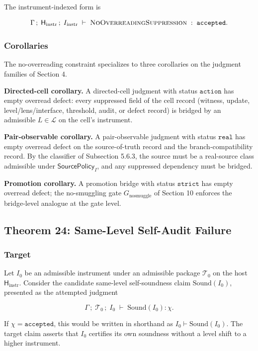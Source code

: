 \documentclass[11pt]{article}
\theoremstyle{definition}
\begin{document}
The instrument-indexed form is

\[
\Gamma\,;\;\mathsf H_{\mathrm{instr}}\,;\;I_{\mathrm{instr}}\;\vdash\;\textsc{NoOverreadingSuppression}\;:\;\texttt{accepted}.
\]

\subsubsection{Corollaries}

The no-overreading constraint specializes to three corollaries on the judgment families of Section 4.

\textbf{Directed-cell corollary.} A directed-cell judgment with status \(\texttt{action}\) has empty overread defect: every suppressed field of the cell record (witness, update, level/lens/interface, threshold, audit, or defect record) is bridged by an admissible \(L\in\mathcal L\) on the cell's instrument.

\textbf{Pair-observable corollary.} A pair-observable judgment with status \(\texttt{real}\) has empty overread defect on the source-of-truth record and the branch-compatibility record. By the classifier of Subsection 5.6.3, the source must be a real-source class admissible under \(\mathsf{SourcePolicy}_I\), and any suppressed dependency must be bridged.

\textbf{Promotion corollary.} A promotion bridge with status \(\texttt{strict}\) has empty overread defect; the no-smuggling gate \(G_{\mathrm{nosmuggle}}\) of Section 10 enforces the bridge-level analogue at the gate level.

\subsection{Theorem 24: Same-Level Self-Audit Failure}

\subsubsection{Target}

Let \(I_0\) be an admissible instrument under an admissible package \(\mathcal T_0\) on the host \(\mathsf H_{\mathrm{instr}}\). Consider the candidate same-level self-soundness claim \(\mathrm{Sound}(I_0)\), presented as the attempted judgment

\[
\Gamma\,;\;\mathcal T_0\,;\;I_0\;\vdash\;\mathrm{Sound}(I_0):\chi.
\]

If \(\chi=\texttt{accepted}\), this would be written in shorthand as \(I_0\vdash\mathrm{Sound}(I_0)\). The target claim asserts that \(I_0\) certifies its own soundness without a level shift to a higher instrument.
\end{document}
